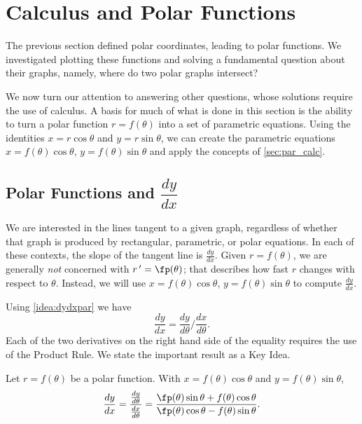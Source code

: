\section{Calculus and Polar Functions} \label{sec:polarcalc}

The previous section defined polar coordinates, leading to polar functions. We investigated plotting these functions and solving a fundamental question about their graphs, namely, where do two polar graphs intersect?

We now turn our attention to answering other questions, whose solutions require the use of calculus. A basis for much of what is done in this section is the ability to turn a polar function $r=f(\theta)$ into a set of parametric equations. Using the identities $x=r\cos \theta$ and $y=r\sin \theta$, we can create the parametric equations $x=f(\theta)\cos\theta$, $y=f(\theta)\sin\theta$ and apply the concepts of \autoref{sec:par_calc}.

\subsection{Polar Functions and \texorpdfstring{$\dfrac{dy}{dx}$}{dy/dx}}

We are interested in the lines tangent to a given graph, regardless of whether that graph is produced by rectangular, parametric, or polar equations. In each of these contexts, the slope of the tangent line is $\frac{dy}{dx}$. Given $r=f(\theta)$, we are generally \textit{not} concerned with $r\,'=\fp(\theta)$; that describes how fast $r$ changes with respect to $\theta$. Instead, we will use $x=f(\theta)\cos\theta$, $y=f(\theta)\sin\theta$ to compute $\frac{dy}{dx}$. 

Using \autoref{idea:dydxpar} we have
\[\frac{dy}{dx} = \frac{dy}{d\theta}\Big/\frac{dx}{d\theta}.\]
Each of the two derivatives on the right hand side of the equality requires the use of the Product Rule. We state the important result as a Key Idea.

{Let $r=f(\theta)$ be a polar function. With $x=f(\theta)\cos\theta$ and $y=f(\theta)\sin\theta$,
\[
 \frac{dy}{dx}
 =\frac{\frac{dy}{d\theta}}{\frac{dx}{d\theta}}
 =\frac{\fp(\theta)\sin\theta+f(\theta)\cos\theta}{\fp(\theta)\cos\theta-f(\theta)\sin\theta}.
\]
}


